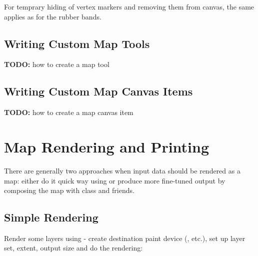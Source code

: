 \documentclass[letterpaper,10pt,english]{manual}
\begin{document}
For temprary hiding of vertex markers and removing them from canvas, the same
applies as for the rubber bands.


\section{Writing Custom Map Tools}

\textbf{TODO:} how to create a map tool


\section{Writing Custom Map Canvas Items}

\textbf{TODO:} how to create a map canvas item

\resetcurrentobjects
\hypertarget{--doc-composer}{}

\hypertarget{composer}{}\chapter{Map Rendering and Printing}

There are generally two approaches when input data should be rendered as a map: either do it quick way using  or
produce more fine-tuned output by composing the map with  class and friends.


\section{Simple Rendering}

Render some layers using  - create destination paint device (,  etc.), set up layer set, extent, output size and do the rendering:
\end{document}
